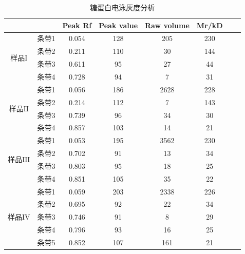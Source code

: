 \newpage
\begin{table}[H]
\centering
\caption{糖蛋白电泳灰度分析}
\label{tab:my-table}
\begin{tabular}{@{}ccccccll@{}}
\toprule
                     &     & Peak Rf & Peak value & Raw volume & Mr/kD &  &  \\ \midrule
\multirow{4}{*}{样品$\mathrm{I}$} & 条带1 & 0.054   & 128        & 205        & 230   &  &  \\
                     & 条带2 & 0.211   & 110        & 30         & 144   &  &  \\
                     & 条带3 & 0.611   & 95         & 27         & 44    &  &  \\
                     & 条带4 & 0.728   & 94         & 7          & 31    &  &  \\  \midrule
\multirow{4}{*}{样品$\mathrm{II}$} & 条带1 & 0.056   & 186        & 2628       & 228   &  &  \\
                     & 条带2 & 0.214   & 112        & 7          & 143   &  &  \\
                     & 条带3 & 0.739   & 96         & 34         & 30    &  &  \\
                     & 条带4 & 0.857   & 103        & 14         & 21    &  &  \\ \midrule
\multirow{4}{*}{样品$\mathrm{III}$} & 条带1 & 0.053   & 195        & 3562       & 230   &  &  \\
                     & 条带2 & 0.702   & 91         & 13         & 34    &  &  \\
                     & 条带3 & 0.803   & 95         & 18         & 25    &  &  \\
                     & 条带4 & 0.851   & 105        & 35         & 22    &  &  \\  \midrule
\multirow{5}{*}{样品$\mathrm{IV}$} & 条带1 & 0.059   & 203        & 2338       & 226   &  &  \\
                     & 条带2 & 0.695   & 92         & 22         & 34    &  &  \\
                     & 条带3 & 0.746   & 91         & 8          & 29    &  &  \\
                     & 条带4 & 0.796   & 93         & 16         & 25    &  &  \\
                     & 条带5 & 0.852   & 107        & 161        & 21    &  &  \\ 
\bottomrule
\end{tabular}
\end{table}

